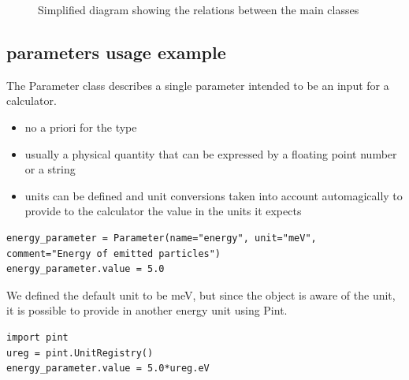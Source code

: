 \documentclass[11pt, a4paper]{article}
\begin{document}
\begin{figure}[tp]

  \label{fig:libpyvinyl_class_relations}
  \caption{Simplified diagram showing the relations between the main \libpyvinyl classes}
\end{figure}

\subsection{\libpyvinyl parameters usage example}
  The Parameter class describes a single parameter intended to be an input for a calculator.

  \begin{itemize}
  \item no a priori for the type
  \item usually a physical quantity that can be expressed by a floating point number or a string
    
  \item units can be defined and unit conversions taken into account automagically to provide to the calculator the value in the units it expects
  \end{itemize}
    \begin{lstlisting}
energy_parameter = Parameter(name="energy", unit="meV", comment="Energy of emitted particles")
energy_parameter.value = 5.0
    \end{lstlisting}
  
  We defined the default unit to be meV, but since the object is aware of the unit, it is possible to provide in another energy unit using Pint.
  \begin{lstlisting}
import pint
ureg = pint.UnitRegistry()
energy_parameter.value = 5.0*ureg.eV
  \end{lstlisting}
\end{document}
